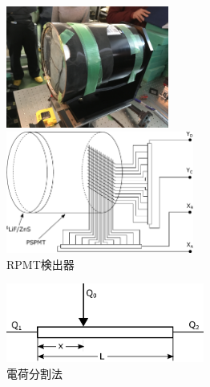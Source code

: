 \begin{figure}[h]
\begin{minipage}{0.5\hsize}
\begin{center}
\includegraphics[height=4cm]{detector/detector_photo2.jpg}
\end{center}
\end{minipage}
\begin{minipage}{0.5\hsize}
\begin{center}
\includegraphics[height=4cm]{detector/detector_fig2.pdf}
\end{center}
\end{minipage}
\caption{RPMT検出器}
\end{figure}
\begin{figure}[h]
\begin{minipage}{0.5\hsize}
\begin{center}
\includegraphics[width=6.5cm]{detector/detector_fig3.pdf}
\caption{電荷分割法}
\end{center}
\end{minipage}
\end{figure}






